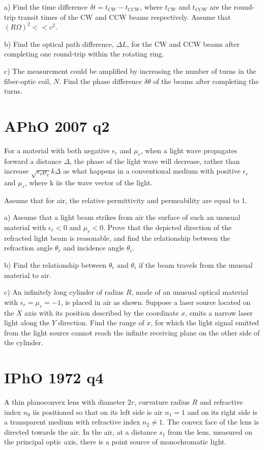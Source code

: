 \documentclass{article}
\newcommand{\<}{\langle}
\renewcommand{\>}{\rangle}
\begin{document}
a) Find the time difference $\delta t = t_{CW} - t_{CCW}$, where $t_{CW}$ and $t_{CCW}$ are the round-trip transit times of the CW and CCW beams respectively. Assume that $(R\Omega)^2 << c^2$.

b) Find the optical path difference, $\Delta L$, for the CW and CCW beams after completing one round-trip within the rotating ring.

c) The measurement could be amplified by increasing the number of turns in the fiber-optic coil, $N$. Find the phase difference $\delta\theta$ of the beams after completing the turns.

\section{APhO 2007 q2}

For a material with both negative $\epsilon_r$ and $\mu_r$, when a light wave propagates forward a distance $\Delta$, the phase of the light wave will decrease, rather than increase $\sqrt{\epsilon_r \mu_r}k\Delta$ as what happens in a conventional medium with positive $\epsilon_r$ and $\mu_r$, where k iis the wave vector of the light.

Assume that for air, the relative permittivity and permeability are equal to 1.

a) Assume that a light beam strikes from air the surface of such an unusual material with $\epsilon_r <0$ and $\mu_r < 0$. Prove that the depicted direction of the refracted light beam is reasonable, and find the relationship between the refraction angle $\theta_r$ and incidence angle $\theta_i$.

b) Find the relationship between $\theta_r$ and $\theta_i$ if the beam travels from the unusual material to air.

c) An infinitely long cylinder of radius $R$, made of an unusual optical material with $\epsilon_r = \mu_r = -1$, is placed in air as shown. Suppose a laser source located on the $X$ axis with its position described by the coordinate $x$, emits a narrow laser light along the $Y$ direction. Find the range of $x$, for which the light signal emitted from the light source cannot reach the infinite receiving plane on the other side of the cylinder.

\section{IPhO 1972 q4}

A thin planoconvex lens with diameter $2r$, curvature radius $R$ and refractive index $n_0$ iis positioned so that on its left side is air $n_1 = 1$ and on its right side is a transparent medium with refractive index $n_2 \neq 1$. The convex face of the lens is directed towards the air. In the air, at a distance $s_1$ from the lens, measured on the principal optic axis, there is a point source of monochromatic light.
\end{document}
